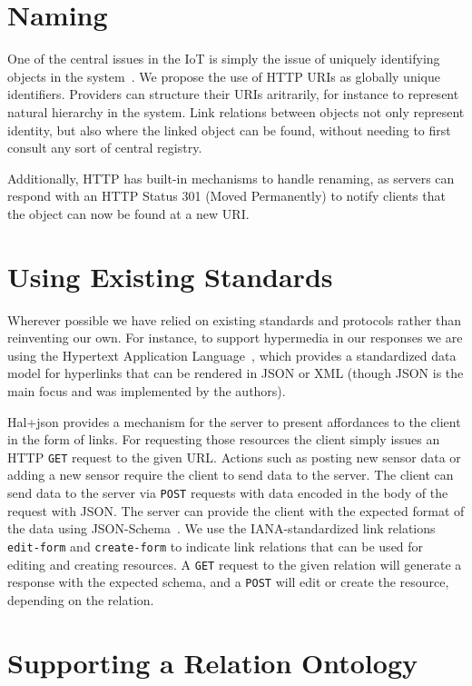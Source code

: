 \documentclass{acm_proc_article-sp}
\begin{document}
\section{Naming}

One of the central issues in the IoT is simply the issue of uniquely
identifying objects in the system~\cite{iotsurvey}. We propose the use of HTTP
URIs as globally unique identifiers.  Providers can structure their URIs
aritrarily, for instance to represent natural hierarchy in the system. Link
relations between objects not only represent identity, but also where the
linked object can be found, without needing to first consult any sort of
central registry.

Additionally, HTTP has built-in mechanisms to handle renaming, as servers can
respond with an HTTP Status 301 (Moved Permanently) to notify clients that the
object can now be found at a new URI.

\section{Using Existing Standards}

Wherever possible we have relied on existing standards and protocols rather
than reinventing our own. For instance, to support hypermedia in our responses
we are using the Hypertext Application Language~\cite{json-hal-draft}, which
provides a standardized data model for hyperlinks that can be rendered in JSON
or XML (though JSON is the main focus and was implemented by the authors).

Hal+json provides a mechanism for the server to present affordances to the
client in the form of links. For requesting those resources the client simply
issues an HTTP \texttt{GET} request to the given URL. Actions such as posting
new sensor data or adding a new sensor require the client to send data to the
server. The client can send data to the server via \texttt{POST} requests with
data encoded in the body of the request with JSON. The server can provide the
client with the expected format of the data using
JSON-Schema~\cite{json-schema-draft}. We use the IANA-standardized link
relations \texttt{edit-form} and \texttt{create-form} to indicate link
relations that can be used for editing and creating resources. A \texttt{GET}
request to the given relation will generate a response with the expected
schema, and a \texttt{POST} will edit or create the resource, depending on the
relation.

\section{Supporting a Relation Ontology}
\end{document}
